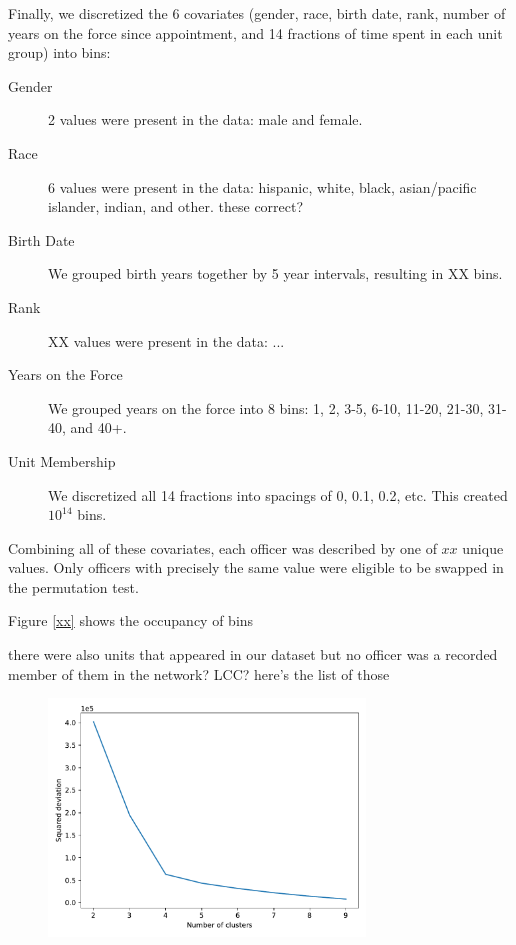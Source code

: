 Finally, we discretized the 6 covariates (gender, race, birth date, rank, number of years on the force since appointment,
and 14 fractions of time spent in each unit group) into bins:
\begin{description}
\item[Gender] 2 values were present in the data: male and female.
\item[Race] 6 values were present in the data: hispanic, white, black, asian/pacific islander, indian, and other. {\color{red} these correct?} 
\item[Birth Date] We grouped birth years together by 5 year intervals, resulting in {\color{red} XX bins}.
\item[Rank] {\color{red}XX values were present in the data: ...}
\item[Years on the Force] We grouped years on the force into 8 bins: 1, 2, 3-5, 6-10, 11-20, 21-30, 31-40, and 40+.
\item[Unit Membership] We discretized all 14 fractions into spacings of 0, 0.1, 0.2, etc. This created $10^{14}$ bins.
\end{description}
Combining all of these covariates, each officer was described by one of $xx$ unique values. Only officers with precisely
the same value were eligible to be swapped in the permutation test. 

Figure \ref{xx} shows the occupancy of bins

{\color{red} there were also units that appeared in our dataset but no officer was a recorded member of them in the network? LCC? here's the list of those}



\begin{figure}[h!]
\centering
\includegraphics[width=0.75\textwidth]{figs/elbow-districts.pdf}
\caption{}\label{fig:districtelbow}
\end{figure}

